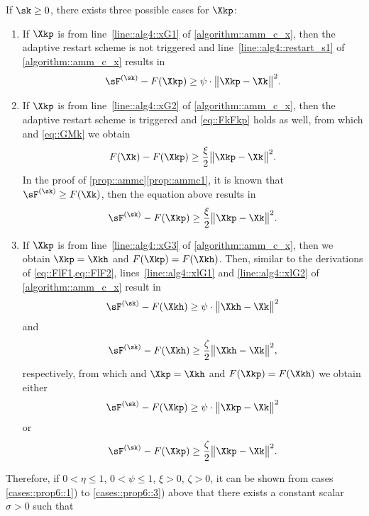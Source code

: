 If $\sk\geq 0$, there exists three possible cases for $\Xkp$:
\begin{enumerate}[leftmargin=0.45cm]
\item\label{cases::prop6::1} If $\Xkp$ is from line~\ref{line::alg4::xG1} of \cref{algorithm::amm_c_x}, then the adaptive restart scheme is not triggered and line~\ref{line::alg4::restart_s1} of \cref{algorithm::amm_c_x} results in
\begin{equation}\label{eq::FlF1}
	 \sF^{(\sk)}-F(\Xkp) \geq \psi\cdot\big\|\Xkp-\Xk\big\|^2.
\end{equation}
\item\label{cases::prop6::2} If $\Xkp$ is from line~\ref{line::alg4::xG2} of \cref{algorithm::amm_c_x}, then the adaptive restart scheme is triggered and \cref{eq::FkFkp} holds as well, from which and \cref{eq::GMk} we obtain
\begin{equation}
\nonumber
F(\Xk)-F(\Xkp)\geq \frac{\xi}{2}\big\|\Xkp-\Xk\big\|^2.
\end{equation}
In the proof of \cref{prop::ammc}\ref{prop::ammc1}, it is known that $\sF^{(\sk)}\geq F(\Xk)$, then the equation above results in
\begin{equation}\label{eq::FlF2}
\sF^{(\sk)}-F(\Xkp)\geq \frac{\xi}{2}\big\|\Xkp-\Xk\big\|^2.
\end{equation}
\item\label{cases::prop6::3} If $\Xkp$ is from line~\ref{line::alg4::xG3} of \cref{algorithm::amm_c_x}, then we obtain $\Xkp=\Xkh$ and $F(\Xkp)=F(\Xkh)$. Then, similar to the derivations of \cref{eq::FlF1,eq::FlF2}, lines~\ref{line::alg4::xlG1} and \ref{line::alg4::xlG2} of \cref{algorithm::amm_c_x} result in
\begin{equation}\label{eq::FlF3}
\sF^{(\sk)}-F(\Xkh) \geq \psi\cdot\big\|\Xkh-\Xk\big\|^2
\end{equation}
and
\begin{equation}\label{eq::FlF4}
\sF^{(\sk)}-F(\Xkh)\geq \frac{\zeta}{2}\big\|\Xkh-\Xk\big\|^2,
\end{equation}
respectively, from which and $\Xkp=\Xkh$ and $F(\Xkp)=F(\Xkh)$ we obtain either
\begin{equation}
\nonumber
\sF^{(\sk)}-F(\Xkp) \geq \psi\cdot\big\|\Xkp-\Xk\big\|^2
\end{equation}
or
\begin{equation}
\nonumber
\sF^{(\sk)}-F(\Xkp)\geq \frac{\zeta}{2}\big\|\Xkp-\Xk\big\|^2.
\end{equation}
\end{enumerate}
Therefore, if $0<\eta\leq 1$, $0<\psi\leq 1$, $\xi>0$, $\zeta>0$, it can be shown from cases \ref{cases::prop6::1}) to \ref{cases::prop6::3}) above that there exists a constant scalar $\sigma>0$ such that
